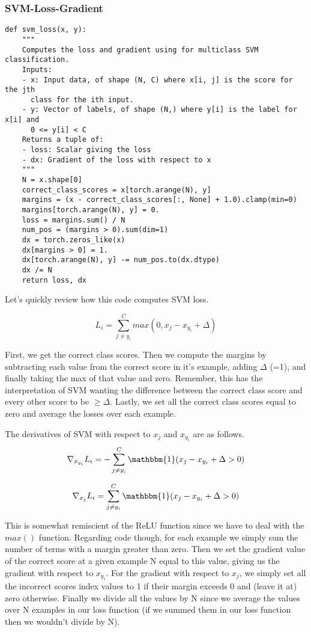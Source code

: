 \documentclass[12pt]{article}
\begin{document}
\subsubsection{SVM-Loss-Gradient}
\begin{verbatim}
def svm_loss(x, y):
    """
    Computes the loss and gradient using for multiclass SVM classification.
    Inputs:
    - x: Input data, of shape (N, C) where x[i, j] is the score for the jth
      class for the ith input.
    - y: Vector of labels, of shape (N,) where y[i] is the label for x[i] and
      0 <= y[i] < C
    Returns a tuple of:
    - loss: Scalar giving the loss
    - dx: Gradient of the loss with respect to x
    """
    N = x.shape[0]
    correct_class_scores = x[torch.arange(N), y]
    margins = (x - correct_class_scores[:, None] + 1.0).clamp(min=0)
    margins[torch.arange(N), y] = 0.
    loss = margins.sum() / N
    num_pos = (margins > 0).sum(dim=1)
    dx = torch.zeros_like(x)
    dx[margins > 0] = 1.
    dx[torch.arange(N), y] -= num_pos.to(dx.dtype)
    dx /= N
    return loss, dx
\end{verbatim}

Let's quickly review how this code computes SVM loss. 

\begin{equation}
    L_{i} = \sum_{j \neq y_{i}}^C max(0, x_{j} - x_{y_{i}} + \Delta)
\end{equation}

First, we get the correct class scores. Then we compute the margins by 
subtracting each value from the correct score in it's example, 
adding $\Delta$ (=1), and finally taking the max of that value and zero. 
Remember, this has the interpretation of SVM wanting the difference between 
the correct class score and every other score to be $\geq \Delta$. Lastly, 
we set all the correct class scores equal to zero and average the losses 
over each example. 

The derivatives of SVM with respect to $x_j$ and $x_{y_i}$ are as follows. 
\begin{equation}
    \nabla_{x_{y_i}} L_i = -\sum_{j \neq y_i}^C \mathbbm{1}
        (x_j - x_{y_i} + \Delta > 0)
\end{equation}

\begin{equation}
    \nabla_{x_j} L_i = \sum_{j \neq y_i}^C \mathbbm{1}
        (x_j - x_{y_i} + \Delta > 0)
\end{equation}

This is somewhat remiscient of the ReLU function since we have to deal with the 
$max()$ function. Regarding code though, for each example we simply sum the number of terms 
with a margin greater than zero. Then we set the gradient value of the correct score at a given example N
equal to this value, giving us the gradient with respect to $x_{y_i}$. For the gradient
with respect to $x_j$, we simply set all the incorrect scores index values to 1 if their
margin exceeds 0 and (leave it at) zero otherwise. Finally we divide all the values by 
N since we average the values over N examples in our loss function (if we summed them in 
our loss function then we wouldn't divide by N). 
\end{document}
